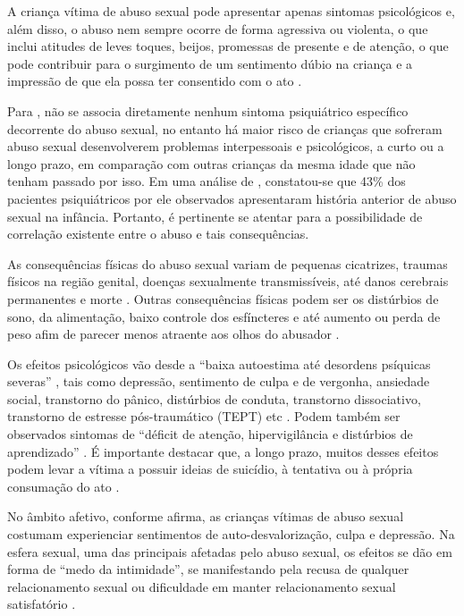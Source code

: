 A criança vítima de abuso sexual pode apresentar apenas sintomas psicológicos e, além disso, o abuso nem sempre ocorre de forma agressiva ou violenta, o que inclui atitudes de leves toques, beijos, promessas de presente e de atenção, o que pode contribuir para o surgimento de um sentimento dúbio na criança e a impressão de que ela possa ter consentido com o ato \cite{RAMOS2009}. 

Para , não se associa diretamente nenhum sintoma psiquiátrico específico decorrente do abuso sexual, no entanto há maior risco de crianças que sofreram abuso sexual desenvolverem problemas interpessoais e psicológicos, a curto ou a longo prazo, em comparação com outras crianças da mesma idade que não tenham passado por isso. Em uma análise de , constatou-se que 43\% dos pacientes psiquiátricos por ele observados apresentaram história anterior de abuso sexual na infância. Portanto, é pertinente se atentar para a possibilidade de correlação existente entre o abuso e tais consequências.

As consequências físicas do abuso sexual variam de  pequenas cicatrizes, traumas físicos na região genital, doenças sexualmente transmissíveis, até danos cerebrais permanentes e morte . Outras consequências físicas podem ser os distúrbios de sono, da alimentação, baixo controle dos esfíncteres e até aumento ou perda de peso afim de parecer menos atraente aos olhos do abusador .

Os efeitos psicológicos vão desde a ``baixa autoestima até desordens psíquicas severas'' , tais como depressão, sentimento de culpa e de vergonha, ansiedade social, transtorno do pânico, distúrbios de conduta, transtorno dissociativo, transtorno de estresse pós-traumático (TEPT) etc . Podem também ser observados sintomas de ``déficit de atenção, hipervigilância e distúrbios de aprendizado'' . É importante destacar que, a longo prazo, muitos desses efeitos podem levar a vítima a possuir ideias de suicídio, à tentativa ou à própria consumação do ato .

No âmbito afetivo, conforme  afirma, as crianças vítimas de abuso sexual costumam experienciar sentimentos de auto-desvalorização, culpa e depressão. Na esfera sexual, uma das principais afetadas pelo abuso sexual, os efeitos se dão em forma de ``medo da intimidade'', se manifestando pela recusa de qualquer relacionamento sexual ou dificuldade em manter relacionamento sexual satisfatório . 

